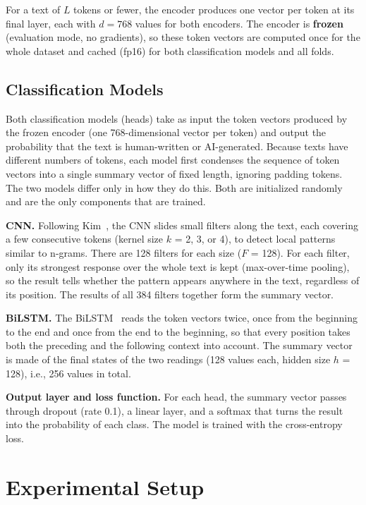 \documentclass[conference,a4paper]{IEEEtran}
\begin{document}
For a text of $L$ tokens or fewer, the encoder produces one vector per token at its final layer, each with $d = 768$ values for both encoders. The encoder is \textbf{frozen} (evaluation mode, no gradients), so these token vectors are computed once for the whole dataset and cached (fp16) for both classification models and all folds.

\subsection{Classification Models}
Both classification models (heads) take as input the token vectors produced by the frozen encoder (one 768-dimensional vector per token) and output the probability that the text is human-written or AI-generated. Because texts have different numbers of tokens, each model first condenses the sequence of token vectors into a single summary vector of fixed length, ignoring padding tokens. The two models differ only in how they do this. Both are initialized randomly and are the only components that are trained.

\textbf{CNN.} Following Kim~\cite{kim2014}, the CNN slides small filters along the text, each covering a few consecutive tokens (kernel size $k$ = 2, 3, or 4), to detect local patterns similar to n-grams. There are 128 filters for each size ($F$ = 128). For each filter, only its strongest response over the whole text is kept (max-over-time pooling), so the result tells whether the pattern appears anywhere in the text, regardless of its position. The results of all 384 filters together form the summary vector.

\textbf{BiLSTM.} The BiLSTM~\cite{lstm,bilstm} reads the token vectors twice, once from the beginning to the end and once from the end to the beginning, so that every position takes both the preceding and the following context into account. The summary vector is made of the final states of the two readings (128 values each, hidden size $h$ = 128), i.e., 256 values in total.

\textbf{Output layer and loss function.} For each head, the summary vector passes through dropout (rate 0.1), a linear layer, and a softmax that turns the result into the probability of each class. The model is trained with the cross-entropy loss.

\section{Experimental Setup}
\label{sec:setup}
\end{document}

